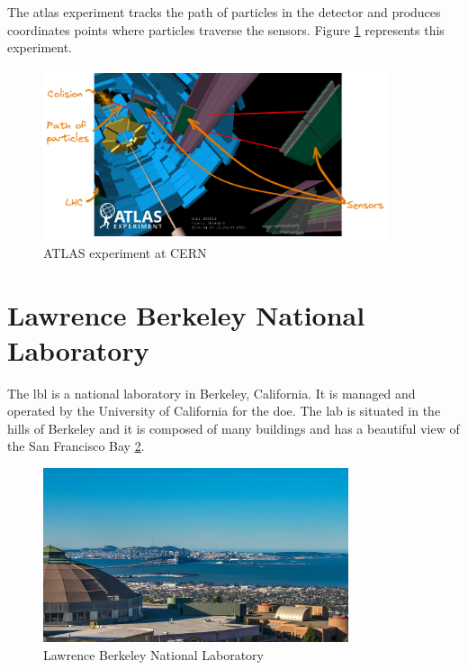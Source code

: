 The \acrfull{atlas} experiment tracks the path of particles in the detector and produces coordinates points where particles traverse the sensors.
Figure \ref{spec:fig:context:physics-simulation:lhc} represents this experiment.
\begin{figure}[ht]
    \centering
    \includegraphics[width=0.9\textwidth]{05-resources/img/spec/experiment-atlas.excalidraw.png}
    \caption{ATLAS experiment at CERN~\cite{atlas-experiment}}
    \label{spec:fig:context:physics-simulation:lhc}
\end{figure}


\section{Lawrence Berkeley National Laboratory}
\label{spec:ch:context:lbl}

The \acrfull{lbl} is a national laboratory in Berkeley, California.
It is managed and operated by the University of California for the \acrfull{doe}.
The lab is situated in the hills of Berkeley and it is composed of many buildings and has a beautiful view of the San Francisco Bay \ref{spec:fig:context:lbl:lab-view}.

\begin{figure}[ht]
    \centering
    \includegraphics[width=0.8\textwidth]{05-resources/img/spec/lab-view.jpg}
    \caption{Lawrence Berkeley National Laboratory}
    \label{spec:fig:context:lbl:lab-view}
\end{figure}


